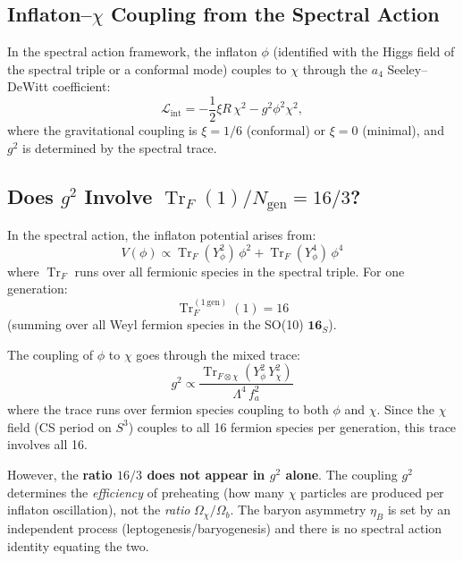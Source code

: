 \documentclass[11pt]{article}
\theoremstyle{definition}
\theoremstyle{remark}
\newcommand{\Tr}{\operatorname{Tr}}
\begin{document}
\subsection{Inflaton--$\chi$ Coupling from the Spectral Action}

In the spectral action framework, the inflaton $\phi$ (identified with
the Higgs field of the spectral triple or a conformal mode) couples to
$\chi$ through the $a_4$ Seeley--DeWitt coefficient:
\begin{equation}
  \mathcal{L}_\mathrm{int} = -\frac{1}{2}\xi R\,\chi^2
  - g^2\phi^2\chi^2,
\end{equation}
where the gravitational coupling is $\xi = 1/6$ (conformal) or $\xi = 0$
(minimal), and $g^2$ is determined by the spectral trace.

\subsection{Does $g^2$ Involve $\Tr_F(1)/N_\mathrm{gen} = 16/3$?}

In the spectral action, the inflaton potential arises from:
\begin{equation}
  V(\phi) \propto \Tr_F(Y_\phi^2)\,\phi^2 + \Tr_F(Y_\phi^4)\,\phi^4
\end{equation}
where $\Tr_F$ runs over all fermionic species in the spectral triple. For
one generation:
\begin{equation}
  \Tr_F^{(1\,\mathrm{gen})}(1) = 16
\end{equation}
(summing over all Weyl fermion species in the SO(10) $\mathbf{16}_S$).

The coupling of $\phi$ to $\chi$ goes through the mixed trace:
\begin{equation}
  g^2 \propto \frac{\Tr_{F \otimes \chi}(Y_\phi^2\,Y_\chi^2)}
  {\Lambda^4\,f_a^2}
\end{equation}
where the trace runs over fermion species coupling to both $\phi$ and
$\chi$. Since the $\chi$ field (CS period on $S^3$) couples to all 16
fermion species per generation, this trace involves all 16.

However, the \textbf{ratio $16/3$ does not appear in $g^2$ alone}. The
coupling $g^2$ determines the \emph{efficiency} of preheating (how many
$\chi$ particles are produced per inflaton oscillation), not the
\emph{ratio} $\Omega_\chi/\Omega_b$. The baryon asymmetry $\eta_B$ is
set by an independent process (leptogenesis/baryogenesis) and there is
no spectral action identity equating the two.
\end{document}
